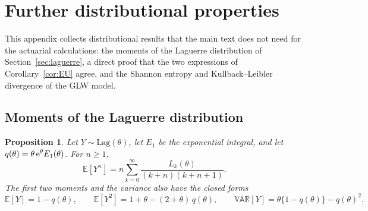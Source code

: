 \documentclass[12pt]{article}
\newcommand{\E}{\mathbb{E}}       %
\newcommand{\Var}{\mathbb{VAR}}   %
\newcommand{\e}{{\rm e}}         %
\newcommand{\Lag}{\mathrm{Lag}}  %
\newtheorem{proposition}{Proposition}
\begin{document}
\renewcommand{\thefigure}{S\arabic{figure}}
\renewcommand{\thetable}{S\arabic{table}}
\renewcommand{\theequation}{S\arabic{equation}}
\renewcommand{\thepage}{S\arabic{page}}
\setcounter{figure}{0}
\setcounter{table}{0}
\setcounter{equation}{0}
\setcounter{page}{1} %

\appendix
\setcounter{proposition}{0}
\renewcommand{\theproposition}{S\arabic{proposition}}
\renewcommand{\theHproposition}{S\arabic{proposition}}

\section{Further distributional properties}\label{app:dist}

This appendix collects distributional results that the main text does not need for the actuarial calculations: the moments of the Laguerre distribution of Section~\ref{sec:laguerre}, a direct proof that the two expressions of Corollary~\ref{cor:EU} agree, and the Shannon entropy and Kullback--Leibler divergence of the GLW model.

\subsection{Moments of the Laguerre distribution}\label{app:laguerre-moments}

\begin{proposition}\label{prop:moments}
Let $Y\sim\Lag(\theta)$, let $E_1$ be the exponential integral, and let $q(\theta)=\theta\,\e^{\theta}E_1(\theta)$. For $n\geq 1$,
\begin{equation}\label{eq:moments}
\E[Y^n]= n \sum_{k=0}^{\infty} \frac{L_k(\theta)}{(k+n)(k+n+1)}.
\end{equation}
The first two moments and the variance also have the closed forms
\[
\E[Y]=1-q(\theta), \qquad \E[Y^2]=1+\theta-(2+\theta)\,q(\theta), \qquad \Var[Y]=\theta\{1-q(\theta)\}-q(\theta)^2.
\]
\end{proposition}
\end{document}

